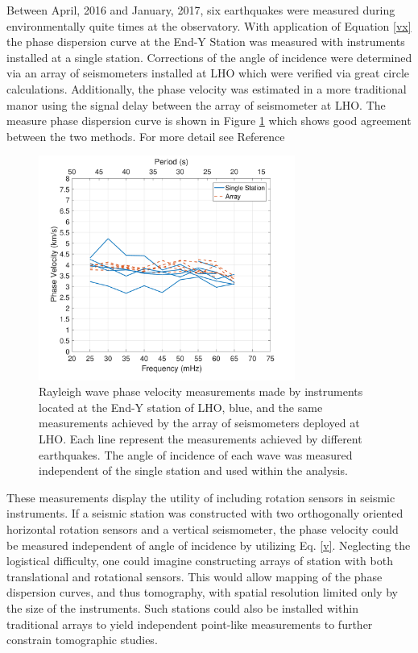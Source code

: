 \documentclass [12pt, proquest]{uwthesis}[2019]
\begin{document}
Between April, 2016 and January, 2017, six earthquakes were measured during environmentally quite times at the observatory. \cite{tiltSeismology} With application of Equation \ref{vx} the phase dispersion curve at the End-Y Station was measured with instruments installed at a single station. Corrections of the angle of incidence were determined via an array of seismometers installed at LHO which were verified via great circle calculations. Additionally, the phase velocity was estimated in a more traditional manor using the signal delay between the array of seismometer at LHO. The measure phase dispersion curve is shown in Figure \ref{Phase_Hanford} which shows good agreement between the two methods. For more detail see Reference \cite{tiltSeismology}
 
\begin{figure}%
\begin{center}
\includegraphics[width=0.75\textwidth]{Vel.pdf}
\caption[Single station Rayleigh wave phase velocity measurements]{Rayleigh wave phase velocity measurements made by instruments located at the End-Y station of LHO, blue, and the same measurements achieved by the array of seismometers deployed at LHO. Each line represent the measurements achieved by different earthquakes. The angle of incidence of each wave was measured independent of the single station and used within the analysis. \cite{tiltSeismology}}
\label{Phase_Hanford}
\end{center}
\end{figure}

These measurements display the utility of including rotation sensors in seismic instruments. If a seismic station was constructed with two orthogonally oriented horizontal rotation sensors and a vertical seismometer, the phase velocity could be measured independent of angle of incidence by utilizing Eq. \ref{v}. Neglecting the logistical difficulty, one could imagine constructing arrays of station with both translational and rotational sensors. This would allow mapping of the phase dispersion curves, and thus tomography, with spatial resolution limited only by the size of the instruments. Such stations could also be installed within traditional arrays to yield independent point-like measurements to further constrain tomographic studies.
\end{document}
